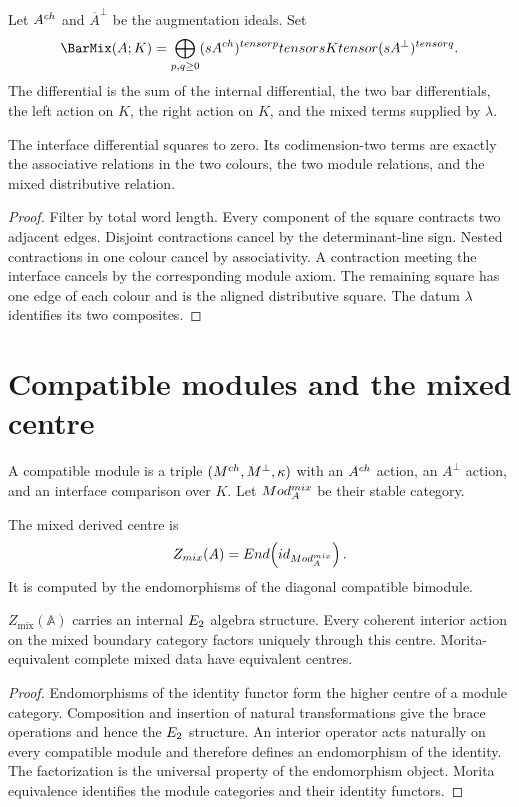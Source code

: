 \begin{construction}
Let $A^{ch}$ and $\overline A^\perp$ be the augmentation ideals.  Set
\[
 \BarMix(\mathbb A;K)
 =\bigoplus_{p,q\ge0}
 (s\overline A^{\ch})^{\tensor p}\tensor sK\tensor
 (s\overline A^\perp)^{\tensor q}.
\]
The differential is the sum of the internal differential, the two bar differentials, the left action on $K$, the right action on $K$, and the mixed terms supplied by $\lambda$.
\end{construction}

\begin{theorem}
The interface differential squares to zero.  Its codimension-two terms are exactly the associative relations in the two colours, the two module relations, and the mixed distributive relation.
\end{theorem}
\begin{proof}
Filter by total word length.  Every component of the square contracts two adjacent edges.  Disjoint contractions cancel by the determinant-line sign.  Nested contractions in one colour cancel by associativity.  A contraction meeting the interface cancels by the corresponding module axiom.  The remaining square has one edge of each colour and is the aligned distributive square.  The datum $\lambda$ identifies its two composites.
\end{proof}

\chapter{Compatible modules and the mixed centre}
A compatible module is a triple $(M^{ch},M^\perp,\kappa)$ with an $A^{ch}$ action, an $A^\perp$ action, and an interface comparison over $K$.  Let $Mod_{A}^{mix}$ be their stable category.

\begin{definition}
The mixed derived centre is
\[
 Z_{mix}(A)
 =End\!\left(id_{Mod_{A}^{mix}}\right).
\]
It is computed by the endomorphisms of the diagonal compatible bimodule.
\end{definition}

\begin{theorem}
$Z_{\mathrm{mix}}(\mathbb A)$ carries an internal $E_2$ algebra structure.  Every coherent interior action on the mixed boundary category factors uniquely through this centre.  Morita-equivalent complete mixed data have equivalent centres.
\end{theorem}
\begin{proof}
Endomorphisms of the identity functor form the higher centre of a module category.  Composition and insertion of natural transformations give the brace operations and hence the $E_2$ structure.  An interior operator acts naturally on every compatible module and therefore defines an endomorphism of the identity.  The factorization is the universal property of the endomorphism object.  Morita equivalence identifies the module categories and their identity functors.
\end{proof}

